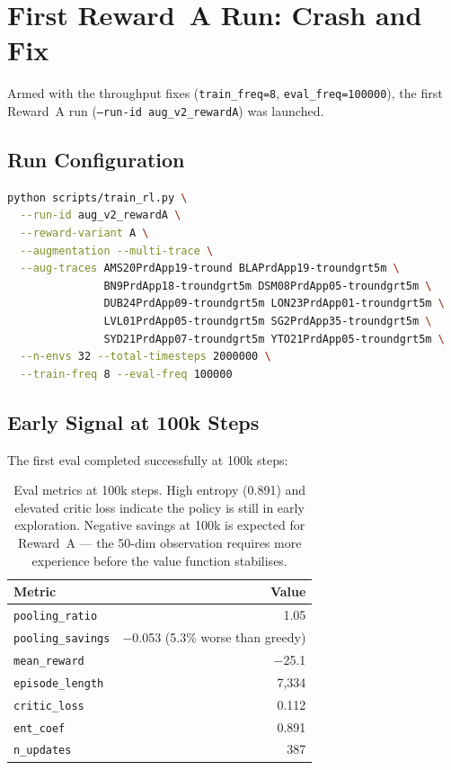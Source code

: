 \documentclass[11pt]{article}
\begin{document}
\section{First Reward~A Run: Crash and Fix}
\label{sec:rewardA-crash}

Armed with the throughput fixes (\texttt{train\_freq=8}, \texttt{eval\_freq=100000}),
the first Reward~A run (\texttt{--run-id aug\_v2\_rewardA}) was launched.

\subsection{Run Configuration}

\begin{lstlisting}[language=bash]
python scripts/train_rl.py \
  --run-id aug_v2_rewardA \
  --reward-variant A \
  --augmentation --multi-trace \
  --aug-traces AMS20PrdApp19-tround BLAPrdApp19-troundgrt5m \
               BN9PrdApp18-troundgrt5m DSM08PrdApp05-troundgrt5m \
               DUB24PrdApp09-troundgrt5m LON23PrdApp01-troundgrt5m \
               LVL01PrdApp05-troundgrt5m SG2PrdApp35-troundgrt5m \
               SYD21PrdApp07-troundgrt5m YTO21PrdApp05-troundgrt5m \
  --n-envs 32 --total-timesteps 2000000 \
  --train-freq 8 --eval-freq 100000
\end{lstlisting}

\subsection{Early Signal at 100k Steps}

The first eval completed successfully at 100k steps:

\begin{table}[h]
\centering
\begin{tabular}{lr}
\toprule
Metric & Value \\
\midrule
\texttt{pooling\_ratio}      & 1.05 \\
\texttt{pooling\_savings}    & $-$0.053 (5.3\% worse than greedy) \\
\texttt{mean\_reward}        & $-$25.1 \\
\texttt{episode\_length}     & 7,334 \\
\texttt{critic\_loss}        & 0.112 \\
\texttt{ent\_coef}           & 0.891 \\
\texttt{n\_updates}          & 387 \\
\bottomrule
\end{tabular}
\caption{Eval metrics at 100k steps. High entropy (0.891) and elevated critic loss
indicate the policy is still in early exploration. Negative savings at 100k is
expected for Reward~A --- the 50-dim observation requires more experience before
the value function stabilises.}
\end{table}
\end{document}
